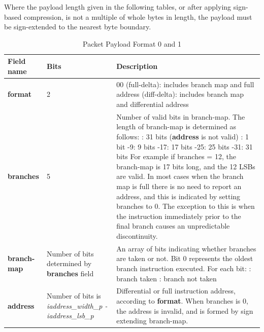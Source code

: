 Where the payload length given in the following tables, or after applying sign-based compression, is not a 
multiple of whole bytes in length, the payload must be sign-extended to the nearest byte boundary.

\begin{table}[htp]
    \centering
    \caption{Packet Payload Format 0 and 1}
    \label{tab:te_inst0-1}
    \begin{tabulary}{\textwidth}{|l|p{35mm}|p{80mm}|}
        \hline
        {\bf Field name} & {\bf Bits} & {\bf Description} \\
        \hline
        \textbf{format}	& 2	& 00 (full-delta): includes branch map and full address  (diff-delta): includes branch map and differential address\\
        \hline
        \textbf{branches} & 5 & Number of valid bits in branch-map. The length of branch-map is determined as follows: :      31 bits (\textbf{address} is not valid) : 	1 bit -9: 	9 bits -17: 	17 bits -25: 	25 bits -31: 	31 bits \newline
        For example if branches = 12, the branch-map is 17 bits long, and the 12 LSBs are valid. \newline
        In most cases when the branch map is full there is no need to report an address,
        and this is indicated by setting branches to 0.  The exception to this is when 
        the instruction immediately prior to the final branch causes an unpredictable discontinuity.\\
        \hline
        \textbf{branch-map} & Number of bits \newline 
                     determined by \newline 
                     \textbf {branches} field & 
                     An array of bits indicating whether branches are taken or not.\newline
        Bit 0 represents the oldest branch instruction executed.   For each bit: : branch taken : branch not taken \\
        \hline
        \textbf{address}	& Number of bits \newline 
                  is \textit {iaddress\_width\_p - iaddress\_lsb\_p} & 
                    Differential or full instruction address, according to \textbf {format}.  \newline
                    When branches is 0, the address is invalid, and is formed by sign extending branch-map.\\
        \hline
    \end{tabulary}
\end{table}


